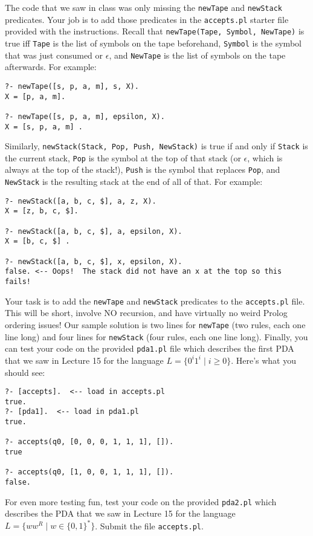 \documentclass[11pt]{article}
\begin{document}
The code that we saw in class was only missing the \verb+newTape+ and \verb+newStack+ predicates.  Your job is to add those predicates in the \verb+accepts.pl+ starter file provided with the instructions.
Recall that \verb+newTape(Tape, Symbol, NewTape)+ is true iff \verb+Tape+ is the list of symbols on the tape beforehand, \verb+Symbol+ is the symbol that was just consumed or $\epsilon$, and \verb+NewTape+ is the list of symbols on the tape afterwards.  For example:
\begin{verbatim}
?- newTape([s, p, a, m], s, X).
X = [p, a, m].

?- newTape([s, p, a, m], epsilon, X).
X = [s, p, a, m] .
\end{verbatim}
Similarly, \verb+newStack(Stack, Pop, Push, NewStack)+ is true if and only if \verb+Stack+ is the current stack, \verb+Pop+ is the symbol at the top of that
stack (or $\epsilon$, which is always at the top of the stack!), \verb+Push+ is the symbol that replaces \verb+Pop+, and \verb+NewStack+ is the resulting stack at the end of all of that.
For example:
\begin{verbatim}
?- newStack([a, b, c, $], a, z, X).
X = [z, b, c, $].

?- newStack([a, b, c, $], a, epsilon, X).
X = [b, c, $] .

?- newStack([a, b, c, $], x, epsilon, X).
false. <-- Oops!  The stack did not have an x at the top so this fails!
\end{verbatim}
Your task is to add the \verb+newTape+ and \verb+newStack+ predicates to the \verb+accepts.pl+ file.  This will be short, involve NO recursion, and have virtually no weird Prolog ordering issues!
Our sample solution is two lines for \verb+newTape+ (two rules, each one line long) and four lines for \verb+newStack+ (four rules, each one line long).
Finally, you can test your code on the provided \verb+pda1.pl+ file which describes the first PDA that we saw in Lecture 15 for the language $L = \{0^i 1^i \mid  i \geq 0 \}$.
Here's what you should see:
\begin{verbatim}
?- [accepts].  <-- load in accepts.pl
true.
?- [pda1].  <-- load in pda1.pl
true.

?- accepts(q0, [0, 0, 0, 1, 1, 1], []).
true 

?- accepts(q0, [1, 0, 0, 1, 1, 1], []).
false.
\end{verbatim}
For even more testing fun, test your code on the provided \verb+pda2.pl+ which describes the PDA that we saw in Lecture 15 for the language $L= \{w w^R \mid w \in \{0, 1\}^* \}$.
Submit the file \verb+accepts.pl+.
\end{document}
